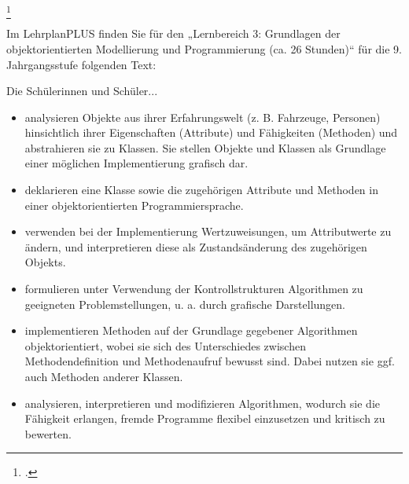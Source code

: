 \documentclass{lehramt-informatik-aufgabe}
\begin{document}
\footcite{examen:66118:2021:03}

Im LehrplanPLUS finden Sie für den „Lernbereich 3: Grundlagen der
objektorientierten Modellierung und Programmierung (ca. 26 Stunden)“ für
die 9. Jahrgangsstufe folgenden Text:

\begin{liKasten}


Die Schülerinnen und Schüler...

\begin{itemize}

\item analysieren Objekte aus ihrer Erfahrungswelt (z. B. Fahrzeuge,
Personen) hinsichtlich ihrer Eigenschaften (Attribute) und Fähigkeiten
(Methoden) und abstrahieren sie zu Klassen. Sie stellen Objekte und
Klassen als Grundlage einer möglichen Implementierung grafisch dar.

\item deklarieren eine Klasse sowie die zugehörigen Attribute und
Methoden in einer objektorientierten Programmiersprache.

\item verwenden bei der Implementierung Wertzuweisungen, um
Attributwerte zu ändern, und interpretieren diese als Zustandsänderung
des zugehörigen Objekts.

\item formulieren unter Verwendung der Kontrollstrukturen Algorithmen zu
geeigneten Problemstellungen, u. a. durch grafische Darstellungen.

\item implementieren Methoden auf der Grundlage gegebener Algorithmen
objektorientiert, wobei sie sich des Unterschiedes zwischen
Methodendefinition und Methodenaufruf bewusst sind. Dabei nutzen sie
ggf. auch Methoden anderer Klassen.

\item analysieren, interpretieren und modifizieren Algorithmen, wodurch
sie die Fähigkeit erlangen, fremde Programme flexibel einzusetzen und
kritisch zu bewerten.


\end{itemize}
\end{liKasten}
\end{document}
